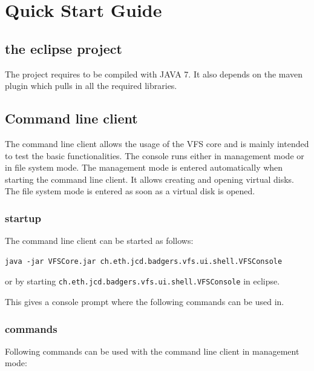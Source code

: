 

\section{Quick Start Guide}


\subsection{the eclipse project}
The project requires to be compiled with JAVA 7. It also depends on the maven
plugin which pulls in all the required libraries.

\subsection{Command line client}

The command line client allows the usage of the VFS core and is mainly intended
to test the basic functionalities. The console runs either in  management mode
or in file system mode. The management mode is entered automatically when
starting the command line client. It allows creating and opening virtual
disks. The file system mode is entered as soon as a virtual disk is opened.


\subsubsection{startup}
The command line client can be started as follows:

\begin{verbatim}
java -jar VFSCore.jar ch.eth.jcd.badgers.vfs.ui.shell.VFSConsole
\end{verbatim}

or by starting \verb|ch.eth.jcd.badgers.vfs.ui.shell.VFSConsole| in eclipse.



This gives a console prompt where the following commands can be used in.

\subsubsection{commands}
Following commands can be used with the command line client in management mode:

